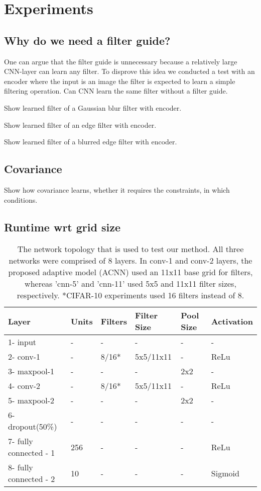 \documentclass{bmvc2k}
\begin{document}
\section{Experiments}
\label{sec:experiments}

\subsection{Why do we need a filter guide?}

One can argue that the filter guide is unnecessary because a relatively large CNN-layer can learn any filter. To disprove this idea we conducted a test with an encoder where the input is an image the filter is expected to learn a simple filtering operation. Can CNN learn the same filter without a filter guide. 

Show learned filter of a Gaussian blur filter with encoder. 

Show learned filter of an edge filter with encoder.

Show learned filter of a blurred edge filter with encoder.  


\subsection{Covariance}

Show how covariance learns, whether it requires the constraints, in which conditions. \\


\subsection{Runtime wrt grid size}



\begin{table}
\centering
\caption{The network topology that is used to test our method. All three networks were comprised of 8 layers. In conv-1 and conv-2 layers, the proposed adaptive model (ACNN) used an 11x11 base grid for filters, whereas 'cnn-5' and 'cnn-11' used 5x5 and 11x11 filter sizes, respectively. *CIFAR-10 experiments used 16 filters instead of 8.}
\bigskip
\begin{tabular}{ | l | l | l | l | l | l |}
	\hline
	Layer & Units & Filters & Filter Size & Pool Size & Activation \\ \hline
	1- input & - & - & - & - & - \\ \hline
	2- conv-1 & - & 8/16* & 5x5/11x11 & - & ReLu \\ \hline
	3- maxpool-1 & - & - & - & 2x2 & - \\ \hline
	4- conv-2 & - & 8/16* & 5x5/11x11 & - & ReLu \\ \hline
	5- maxpool-2 & - & - & - & 2x2 & - \\ \hline
	6- dropout(50\%) & - & - & - & - & - \\ \hline
	7- fully connected - 1 & 256 & - & - & - & ReLu \\ \hline
	8- fully connected - 2 & 10 & - & - & - & Sigmoid \\ \hline
\end{tabular}
\label{table:network}

\end{table}
\end{document}
